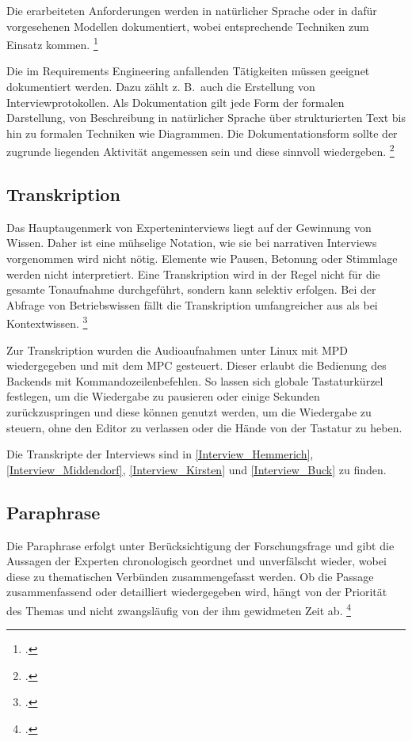 Die erarbeiteten Anforderungen werden in natürlicher Sprache oder in dafür vorgesehenen Modellen dokumentiert, wobei entsprechende Techniken zum Einsatz kommen. \footcite[Vgl.][4]{Pohl_2015_Requirements}

Die im Requirements Engineering anfallenden Tätigkeiten müssen geeignet dokumentiert werden. Dazu zählt z. B.~auch die Erstellung von Interviewprotokollen. Als Dokumentation gilt jede Form der formalen Darstellung, von Beschreibung in natürlicher Sprache über strukturierten Text bis hin zu formalen Techniken wie Diagrammen. Die Dokumentationsform sollte der zugrunde liegenden Aktivität angemessen sein und diese sinnvoll wiedergeben. \footcite[Vgl.][35\psqq]{Pohl_2015_Requirements}


\subsection{Transkription}
Das Hauptaugenmerk von Experteninterviews liegt auf der Gewinnung von Wissen. Daher ist eine mühselige Notation, wie sie bei narrativen Interviews vorgenommen wird nicht nötig. Elemente wie Pausen, Betonung oder Stimmlage werden nicht interpretiert.
Eine Transkription wird in der Regel nicht für die gesamte Tonaufnahme durchgeführt, sondern kann selektiv erfolgen. Bei der Abfrage von Betriebswissen fällt die Transkription umfangreicher aus als bei Kontextwissen. \footcite[Vgl.][455\psq]{Meuser_1991_Interview}

Zur Transkription wurden die Audioaufnahmen unter Linux mit \acf{MPD} wiedergegeben und mit dem \acf{MPC} gesteuert. Dieser erlaubt die Bedienung des Backends mit Kommandozeilenbefehlen. So lassen sich globale Tastaturkürzel festlegen, um die Wiedergabe zu pausieren oder einige Sekunden zurückzuspringen und diese können genutzt werden, um die Wiedergabe zu steuern, ohne den Editor zu verlassen oder die Hände von der Tastatur zu heben.

Die Transkripte der Interviews sind in \autoref{Interview_Hemmerich}, \autoref{Interview_Middendorf}, \autoref{Interview_Kirsten} und \autoref{Interview_Buck} zu finden.


\subsection{Paraphrase}
Die Paraphrase erfolgt unter Berücksichtigung der Forschungsfrage und gibt die Aussagen der Experten chronologisch geordnet und unverfälscht wieder, wobei diese zu thematischen Verbünden zusammengefasst werden. Ob die Passage zusammenfassend oder detailliert wiedergegeben wird, hängt von der Priorität des Themas und nicht zwangsläufig von der ihm gewidmeten Zeit ab.
\footcite[Vgl.][456\psq]{Meuser_1991_Interview}


